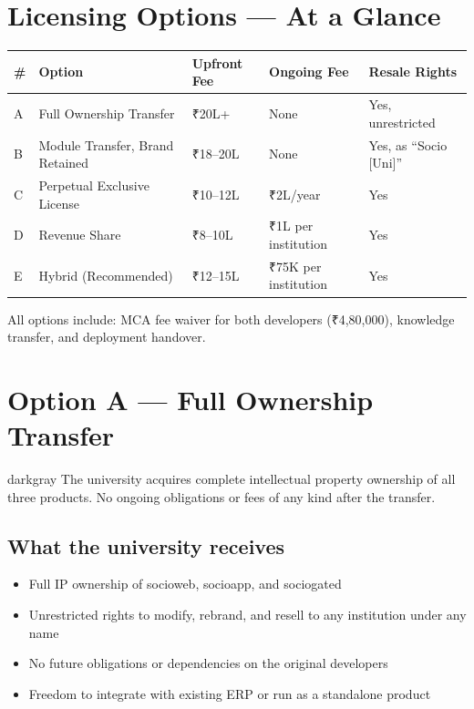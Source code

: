 \documentclass[12pt,a4paper]{article}
\begin{document}
\newpage
\section{Licensing Options — At a Glance}

\begin{tabularx}{\textwidth}{C{0.5cm} L{4cm} C{2.3cm} C{2.3cm} C{2.3cm}}
\toprule
{}
\textbf{\#} & \textbf{Option} & \textbf{Upfront Fee} & \textbf{Ongoing Fee} & \textbf{Resale Rights} \\
\midrule
A & Full Ownership Transfer & ₹20L+ & None & Yes, unrestricted \\
B & Module Transfer, Brand Retained & ₹18–20L & None & Yes, as ``Socio [Uni]'' \\
C & Perpetual Exclusive License & ₹10–12L & ₹2L/year & Yes \\
D & Revenue Share & ₹8–10L & ₹1L per institution & Yes \\
E & Hybrid (Recommended) & ₹12–15L & ₹75K per institution & Yes \\
\bottomrule
\end{tabularx}

\vspace{0.3cm}
{\small\color{darkgray} All options include: MCA fee waiver for both developers (₹4,80,000), knowledge transfer, and deployment handover.}

\newpage
\section{Option A — Full Ownership Transfer}

\begin{scenariobox}{darkgray}
The university acquires complete intellectual property ownership of all three products. No ongoing obligations or fees of any kind after the transfer.
\end{scenariobox}

\vspace{0.4cm}

\subsection*{What the university receives}
\begin{itemize}[leftmargin=*, noitemsep]
    \item Full IP ownership of socioweb, socioapp, and sociogated
    \item Unrestricted rights to modify, rebrand, and resell to any institution under any name
    \item No future obligations or dependencies on the original developers
    \item Freedom to integrate with existing ERP or run as a standalone product
\end{itemize}
\end{document}
